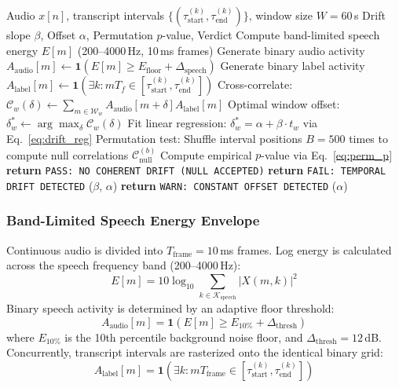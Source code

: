 \documentclass[10pt,journal,compsoc]{IEEEtran}
\begin{document}
\begin{algorithm}[t]
\caption{\texttt{driftcheck-audio}: Speech Drift and Permutation Testing}
\label{alg:driftcheck}
\begin{algorithmic}[1]
\REQUIRE Audio $x[n]$, transcript intervals $\{(\tau_{\text{start}}^{(k)}, \tau_{\text{end}}^{(k)})\}$, window size $W = 60$\,s
\ENSURE Drift slope $\beta$, Offset $\alpha$, Permutation $p$-value, Verdict
\STATE Compute band-limited speech energy $E[m]$ (200--4000\,Hz, 10\,ms frames)
\STATE Generate binary audio activity $A_{\text{audio}}[m] \leftarrow \mathbf{1}(E[m] \ge E_{\text{floor}} + \Delta_{\text{speech}})$
\STATE Generate binary label activity $A_{\text{label}}[m] \leftarrow \mathbf{1}(\exists k : m T_f \in [\tau_{\text{start}}^{(k)}, \tau_{\text{end}}^{(k)}])$
    \STATE Cross-correlate: $\mathcal{C}_w(\delta) \leftarrow \sum_{m \in \mathcal{W}_w} A_{\text{audio}}[m + \delta] A_{\text{label}}[m]$
    \STATE Optimal window offset: $\delta_w^* \leftarrow \arg\max_\delta \mathcal{C}_w(\delta)$
\ENDFOR
\STATE Fit linear regression: $\delta_w^* = \alpha + \beta \cdot t_w$ via Eq.~\eqref{eq:drift_reg}
\STATE Permutation test: Shuffle interval positions $B = 500$ times to compute null correlations $\mathcal{C}_{\text{null}}^{(b)}$
\STATE Compute empirical $p$-value via Eq.~\eqref{eq:perm_p}
    \STATE \textbf{return} \texttt{PASS: NO COHERENT DRIFT (NULL ACCEPTED)}
    \STATE \textbf{return} \texttt{FAIL: TEMPORAL DRIFT DETECTED} ($\beta$, $\alpha$)
\ELSE
    \STATE \textbf{return} \texttt{WARN: CONSTANT OFFSET DETECTED} ($\alpha$)
\ENDIF
\end{algorithmic}
\end{algorithm}

\subsubsection{Band-Limited Speech Energy Envelope}
Continuous audio is divided into $T_{\text{frame}} = 10$\,ms frames. Log energy is calculated across the speech frequency band (200--4000\,Hz):
\begin{equation}
E[m] = 10 \log_{10} \sum_{k \in \mathcal{K}_{\text{speech}}} |X(m, k)|^2
\label{eq:speech_energy}
\end{equation}
Binary speech activity is determined by an adaptive floor threshold:
\begin{equation}
A_{\text{audio}}[m] = \mathbf{1}(E[m] \ge E_{10\%} + \Delta_{\text{thresh}})
\label{eq:bin_audio}
\end{equation}
where $E_{10\%}$ is the 10th percentile background noise floor, and $\Delta_{\text{thresh}} = 12$\,dB. Concurrently, transcript intervals are rasterized onto the identical binary grid:
\begin{equation}
A_{\text{label}}[m] = \mathbf{1}\left( \exists k : m T_{\text{frame}} \in [\tau_{\text{start}}^{(k)}, \tau_{\text{end}}^{(k)}] \right)
\label{eq:bin_label}
\end{equation}
\end{document}
